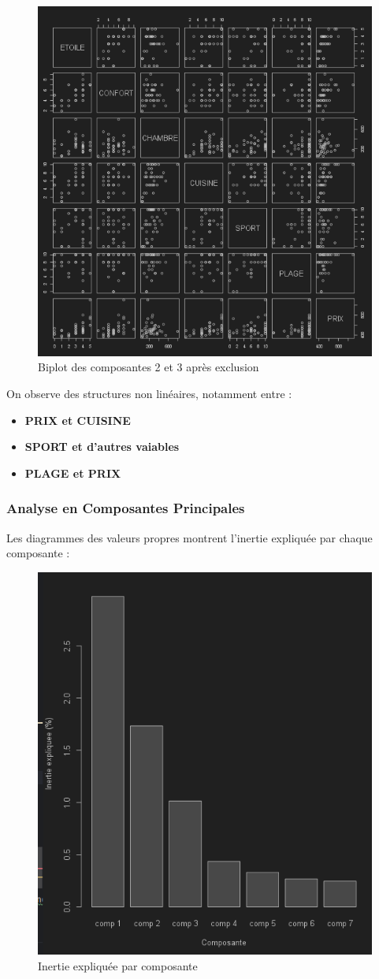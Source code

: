 \documentclass{article}
\begin{document}
    \begin{figure}[H]
        \centering
        \includegraphics[width=0.6\linewidth]{img/pairhotel}
        \caption{Biplot des composantes 2 et 3 après exclusion}
    \end{figure}


    On observe des structures non linéaires, notamment entre :
    \begin{itemize}
        \item \textbf{PRIX et CUISINE}
        \item \textbf{SPORT et d'autres vaiables}
        \item \textbf{PLAGE et PRIX}
    \end{itemize}

    \subsubsection{Analyse en Composantes Principales}

    Les diagrammes des valeurs propres montrent l’inertie expliquée par chaque composante :

    \begin{figure}[H]
        \centering
        \includegraphics[width=0.6\linewidth]{img/inertie_expliquee}
        \caption{Inertie expliquée par composante}
    \end{figure}
\end{document}
